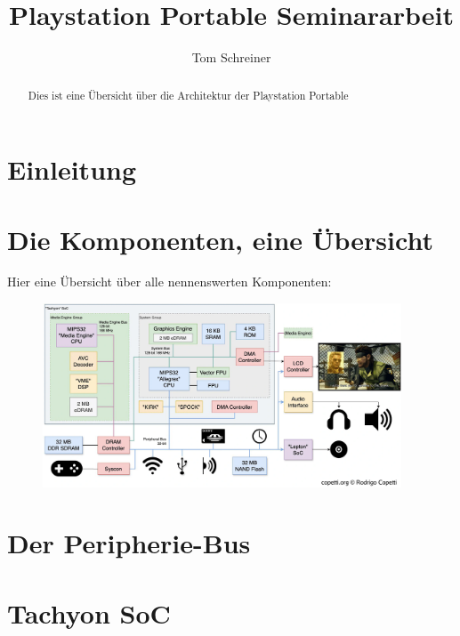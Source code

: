 \documentclass{hhuarticle}
\title{Playstation Portable Seminararbeit} %
\author{Tom Schreiner} %
\begin{document}
  \maketitle

  \begin{abstract} %
    Dies ist eine Übersicht über die Architektur der Playstation Portable
  \end{abstract}

\tableofcontents
\newpage

  \section{Einleitung}


  \section{Die Komponenten, eine Übersicht}
  Hier eine Übersicht über alle nennenswerten Komponenten:\\

  \begin{figure}[h]
      \begin{center}
        \includegraphics[width=0.95\textwidth]{fig/architecture.png}
      \end{center}
      \caption{}\label{fig:Architektur}
    \end{figure}
    

  \section{Der Peripherie-Bus}

  \section{Tachyon SoC}
\end{document}
